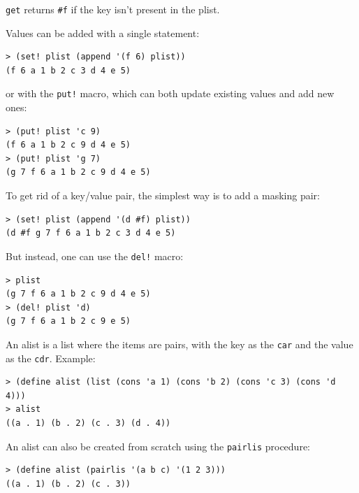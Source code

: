 \documentclass[twoside,9pt]{report}
\begin{document}
{\texttt{get} returns \texttt{\#f} if the key isn't present in the plist.


Values can be added with a single statement:

\noindent\makebox[\linewidth]{\rule{\linewidth}{0.4pt}}
\begin{lstlisting}
> (set! plist (append '(f 6) plist))
(f 6 a 1 b 2 c 3 d 4 e 5)
\end{lstlisting}
\noindent\makebox[\linewidth]{\rule{\linewidth}{0.4pt}}

or with the \texttt{put!} macro, which can both update existing values and add new ones:

\noindent\makebox[\linewidth]{\rule{\linewidth}{0.4pt}}
\begin{lstlisting}
> (put! plist 'c 9)
(f 6 a 1 b 2 c 9 d 4 e 5)
> (put! plist 'g 7)
(g 7 f 6 a 1 b 2 c 9 d 4 e 5)
\end{lstlisting}
\noindent\makebox[\linewidth]{\rule{\linewidth}{0.4pt}}

To get rid of a key/value pair, the simplest way is to add a masking pair:

\noindent\makebox[\linewidth]{\rule{\linewidth}{0.4pt}}
\begin{lstlisting}
> (set! plist (append '(d #f) plist))
(d #f g 7 f 6 a 1 b 2 c 3 d 4 e 5)
\end{lstlisting}
\noindent\makebox[\linewidth]{\rule{\linewidth}{0.4pt}}

But instead, one can use the \texttt{del!} macro:

\noindent\makebox[\linewidth]{\rule{\linewidth}{0.4pt}}
\begin{lstlisting}
> plist
(g 7 f 6 a 1 b 2 c 9 d 4 e 5)
> (del! plist 'd)
(g 7 f 6 a 1 b 2 c 9 e 5)
\end{lstlisting}
\noindent\makebox[\linewidth]{\rule{\linewidth}{0.4pt}}

An alist is a list where the items are pairs, with the key as the \texttt{car} and the value as the \texttt{cdr}. Example:

\noindent\makebox[\linewidth]{\rule{\linewidth}{0.4pt}}
\begin{lstlisting}
> (define alist (list (cons 'a 1) (cons 'b 2) (cons 'c 3) (cons 'd 4)))
> alist
((a . 1) (b . 2) (c . 3) (d . 4))
\end{lstlisting}
\noindent\makebox[\linewidth]{\rule{\linewidth}{0.4pt}}

An alist can also be created from scratch using the \texttt{pairlis} procedure:

\noindent\makebox[\linewidth]{\rule{\linewidth}{0.4pt}}
\begin{lstlisting}
> (define alist (pairlis '(a b c) '(1 2 3)))
((a . 1) (b . 2) (c . 3))
\end{lstlisting}
\noindent\makebox[\linewidth]{\rule{\linewidth}{0.4pt}}

}
\end{document}
